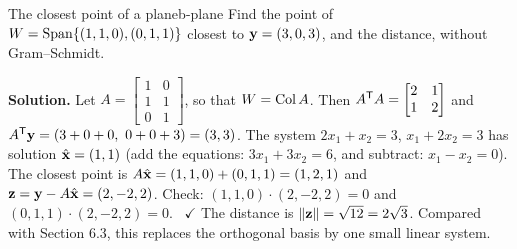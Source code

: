 \documentclass[11pt]{article}
\begin{document}
\begin{exmp}{The closest point of a plane}{b-plane}
Find the point of $W=\operatorname{Span}\{(1,1,0),(0,1,1)\}$ closest to $\mathbf{y}=(3,0,3)$, and the distance, without Gram--Schmidt.

\textbf{Solution.} Let $A=\begin{bmatrix}1&0\\1&1\\0&1\end{bmatrix}$, so that $W=\operatorname{Col} A$. Then $A^{\mathsf T} A=\begin{bmatrix}2&1\\1&2\end{bmatrix}$ and $A^{\mathsf T}\mathbf{y}=(3+0+0,\ 0+0+3)=(3,3)$. The system $2x_1+x_2=3$, $x_1+2x_2=3$ has solution $\hat{\mathbf{x}}=(1,1)$ (add the equations: $3x_1+3x_2=6$, and subtract: $x_1-x_2=0$). The closest point is $A\hat{\mathbf{x}}=(1,1,0)+(0,1,1)=(1,2,1)$ and $\mathbf{z}=\mathbf{y}-A\hat{\mathbf{x}}=(2,-2,2)$. Check: $(1,1,0)\cdot(2,-2,2)=0$ and $(0,1,1)\cdot(2,-2,2)=0$. \ $\checkmark$ The distance is $\lVert\mathbf{z}\rVert=\sqrt{12}=2\sqrt3$. Compared with Section 6.3, this replaces the orthogonal basis by one small linear system.
\end{exmp}
\end{document}
